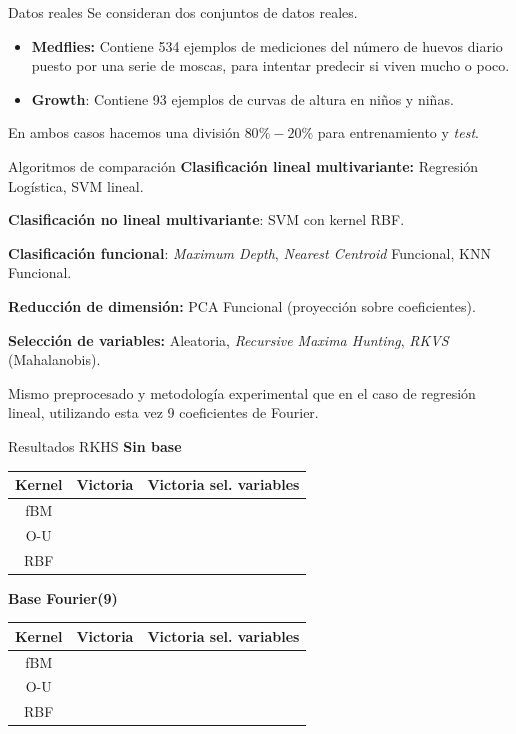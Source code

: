 \documentclass[10pt, spanish, professionalfonts]{beamer}
\newcommand{\cmark}{\ding{51}}%
\newcommand{\xmark}{\ding{55}}%
\begin{document}
\begin{frame}{Datos reales}
  Se consideran dos conjuntos de datos reales.
  \begin{itemize}
    \item \textbf{Medflies:} Contiene 534 ejemplos de mediciones del número de huevos diario puesto por una serie de moscas, para intentar predecir si viven mucho o poco.
    \item \textbf{Growth}: Contiene 93 ejemplos de curvas de altura en niños y niñas.
  \end{itemize}

  En ambos casos hacemos una división \(80\%-20\%\) para entrenamiento y \textit{test}.
\end{frame}

\begin{frame}{Algoritmos de comparación}
  \textbf{Clasificación lineal multivariante:} Regresión Logística, SVM lineal.

  \textbf{Clasificación no lineal multivariante}: SVM con kernel RBF.

  \textbf{Clasificación funcional}: \textit{Maximum Depth}, \textit{Nearest Centroid} Funcional, KNN Funcional.

  \textbf{Reducción de dimensión:} PCA Funcional (proyección sobre coeficientes).

  \textbf{Selección de variables:} Aleatoria, \textit{Recursive Maxima Hunting}, \textit{RKVS} (Mahalanobis).

  \vspace{1em}

  Mismo preprocesado y metodología experimental que en el caso de regresión lineal, utilizando esta vez 9 coeficientes de Fourier.
\end{frame}

\begin{frame}{Resultados RKHS}
\textbf{Sin base}
  \begin{table}
    \begin{tabular}{c|cc}
      Kernel & Victoria & Victoria sel. variables \\ \hline
      fBM & \cmark & \xmark\\
      O-U & \xmark & \cmark\\
      RBF & \cmark & \xmark
    \end{tabular}
  \end{table}

  \textbf{Base Fourier(9)}
  \begin{table}
    \begin{tabular}{c|cc}
      Kernel & Victoria & Victoria sel. variables \\ \hline
      fBM & \cmark &  \cmark\\
      O-U & \cmark & \cmark\\
      RBF & \cmark & \cmark
    \end{tabular}
  \end{table}
\end{frame}
\end{document}
